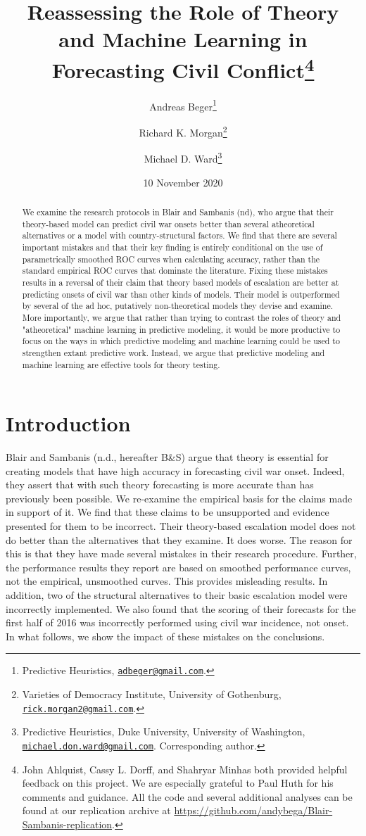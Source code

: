 \documentclass[
]{article}
\title{Reassessing the Role of Theory and Machine Learning in Forecasting Civil Conflict\thanks{John Ahlquist, Cassy L. Dorff, and Shahryar Minhas both provided helpful feedback on this project. We are especially grateful to Paul Huth for his comments and guidance. All the code and several additional analyses can be found at our replication archive at \url{https://github.com/andybega/Blair-Sambanis-replication}.}}
\author{Andreas Beger\footnote{Predictive Heuristics, \href{mailto:adbeger@gmail.com}{\nolinkurl{adbeger@gmail.com}}.} \and Richard K. Morgan\footnote{Varieties of Democracy Institute, University of Gothenburg, \href{mailto:rick.morgan2@gmail.com}{\nolinkurl{rick.morgan2@gmail.com}}.} \and Michael D. Ward\footnote{Predictive Heuristics, Duke University, University of Washington, \href{mailto:michael.don.ward@gmail.com}{\nolinkurl{michael.don.ward@gmail.com}}. Corresponding author.}}
\date{10 November 2020}
\begin{document}
\maketitle
\begin{abstract}
We examine the research protocols in Blair and Sambanis (nd), who argue that their theory-based model can predict civil war onsets better than several atheoretical alternatives or a model with country-structural factors. We find that there are several important mistakes and that their key finding is entirely conditional on the use of parametrically smoothed ROC curves when calculating accuracy, rather than the standard empirical ROC curves that dominate the literature. Fixing these mistakes results in a reversal of their claim that theory based models of escalation are better at predicting onsets of civil war than other kinds of models. Their model is outperformed by several of the ad hoc, putatively non-theoretical models they devise and examine. More importantly, we argue that rather than trying to contrast the roles of theory and "atheoretical" machine learning in predictive modeling, it would be more productive to focus on the ways in which predictive modeling and machine learning could be used to strengthen extant predictive work. Instead, we argue that predictive modeling and machine learning are effective tools for theory testing.
\end{abstract}

\hypertarget{introduction}{%
\section{Introduction}\label{introduction}}

Blair and Sambanis (n.d., hereafter B\&S) argue that theory is essential for creating models that have high accuracy in forecasting civil war onset. Indeed, they assert that with such theory forecasting is more accurate than has previously been possible. We re-examine the empirical basis for the claims made in support of it. We find that these claims to be unsupported and evidence presented for them to be incorrect. Their theory-based escalation model does not do better than the alternatives that they examine. It does worse. The reason for this is that they have made several mistakes in their research procedure. Further, the performance results they report are based on smoothed performance curves, not the empirical, unsmoothed curves. This provides misleading results. In addition, two of the structural alternatives to their basic escalation model were incorrectly implemented. We also found that the scoring of their forecasts for the first half of 2016 was incorrectly performed using civil war incidence, not onset. In what follows, we show the impact of these mistakes on the conclusions.
\end{document}
